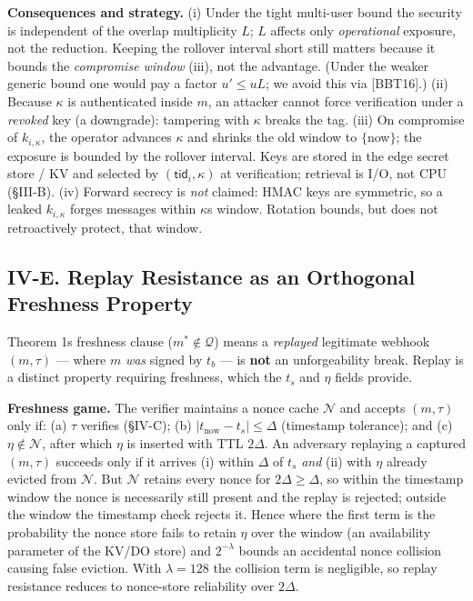 \textbf{Consequences and strategy.} (i) Under the tight multi-user bound
the security is independent of the overlap multiplicity \(L\); \(L\)
affects only \emph{operational} exposure, not the reduction. Keeping the
rollover interval short still matters because it bounds the
\emph{compromise window} (iii), not the advantage. (Under the weaker
generic bound one would pay a factor \(u'\le uL\); we avoid this via
{[}BBT16{]}.) (ii) Because \(\kappa\) is authenticated inside \(m\), an
attacker cannot force verification under a \emph{revoked} key (a
downgrade): tampering with \(\kappa\) breaks the tag. (iii) On
compromise of \(k_{i,\kappa}\), the operator advances \(\kappa\) and
shrinks the old window to \(\{\)now\(\}\); the exposure is bounded by
the rollover interval. Keys are stored in the edge secret store / KV and
selected by \((\mathsf{tid}_i,\kappa)\) at verification; retrieval is
I/O, not CPU (§III-B). (iv) Forward secrecy is \emph{not} claimed: HMAC
keys are symmetric, so a leaked \(k_{i,\kappa}\) forges messages within
\(\kappa\)\textquotesingle s window. Rotation bounds, but does not
retroactively protect, that window.

\subsection{IV-E. Replay Resistance as an Orthogonal Freshness
Property}\label{iv-e-replay-resistance-as-an-orthogonal-freshness-property}

Theorem 1\textquotesingle s freshness clause (\(m^*\notin\mathcal{Q}\))
means a \emph{replayed} legitimate webhook \((m,\tau)\) --- where \(m\)
\emph{was} signed by \(t_b\) --- is \textbf{not} an unforgeability
break. Replay is a distinct property requiring freshness, which the
\(t_s\) and \(\eta\) fields provide.

\textbf{Freshness game.} The verifier maintains a nonce cache
\(\mathcal{N}\) and accepts \((m,\tau)\) only if: (a) \(\tau\) verifies
(§IV-C); (b) \(|t_{\text{now}}-t_s|\le\Delta\) (timestamp tolerance);
and (c) \(\eta\notin\mathcal{N}\), after which \(\eta\) is inserted with
TTL \(2\Delta\). An adversary replaying a captured \((m,\tau)\) succeeds
only if it arrives (i) within \(\Delta\) of \(t_s\) \emph{and} (ii) with
\(\eta\) already evicted from \(\mathcal{N}\). But \(\mathcal{N}\)
retains every nonce for \(2\Delta\ge\Delta\), so within the timestamp
window the nonce is necessarily still present and the replay is
rejected; outside the window the timestamp check rejects it. Hence
where the first term is the probability the nonce store fails to retain
\(\eta\) over the window (an availability parameter of the KV/DO store)
and \(2^{-\lambda}\) bounds an accidental nonce collision causing false
eviction. With \(\lambda=128\) the collision term is negligible, so
replay resistance reduces to nonce-store reliability over \(2\Delta\).

